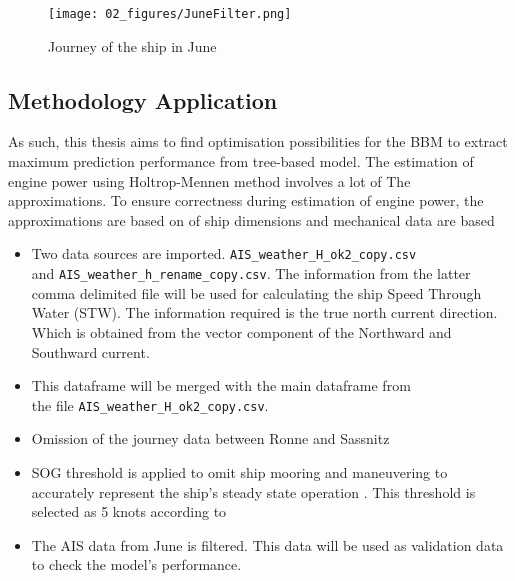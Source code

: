 \begin{figure}
    \centering
        \texttt{[image: 02\_figures/JuneFilter.png]}
        \caption{Journey of the ship in June}
        \label{fig:JuneJourney}
\end{figure}

\subsection{Methodology Application}\label{sec:methodology_application}

As such, this thesis aims to find optimisation possibilities for the BBM to extract maximum prediction performance from tree-based model. The estimation of engine power using Holtrop-Mennen method involves a lot of The approximations. To ensure correctness during estimation of engine power, the approximations are based on   of ship dimensions and mechanical data are based  

\begin{itemize}
    \item Two data sources are imported. {\tt AIS\_weather\_H\_ok2\_copy.csv} \\ and {\tt AIS\_weather\_h\_rename\_copy.csv}. The information from the latter comma delimited 
    file will be used for calculating the ship Speed Through Water (STW).  
    The information required is the true north current direction. Which is obtained from the vector component of the Northward and Southward current.
    \item This dataframe will be merged with the main dataframe from \\ the file {\tt AIS\_weather\_H\_ok2\_copy.csv}.
    \item Omission of the journey data between Ronne and Sassnitz
    \item SOG threshold is applied to omit ship mooring and maneuvering to accurately represent the ship's steady state operation 
    \cite{Abebe.2020,BalBesikci.2016,Gkerekos.2019,Yang.2020}. This threshold is selected as 5 knots according to \cite{Abebe.2020}
    \item The AIS data from June is filtered. This data will be used as validation data to check the model's performance.
\end{itemize}
 
